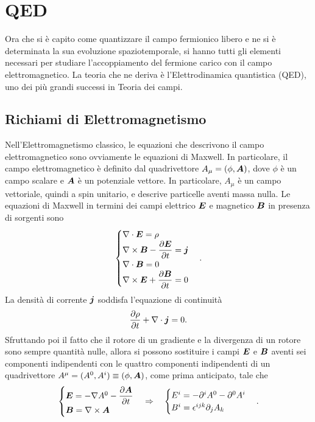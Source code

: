 \chapter{QED}
Ora che si è capito come quantizzare il campo fermionico libero e ne si è determinata la sua evoluzione spaziotemporale, si hanno tutti gli elementi necessari per studiare l'accoppiamento del fermione carico con il campo elettromagnetico. La teoria che ne deriva è l'Elettrodinamica quantistica (QED), uno dei più grandi successi in Teoria dei campi.

\section{Richiami di Elettromagnetismo}
Nell'Elettromagnetismo classico, le equazioni che descrivono il campo elettromagnetico sono ovviamente le equazioni di Maxwell. In particolare, il campo elettromagnetico è definito dal quadrivettore $A_\mu = (\phi,\bm{A})$, dove $\phi$ è un campo scalare e $\bm{A}$ è un potenziale vettore. In particolare, $A_\mu$ è un campo vettoriale, quindi a spin unitario, e descrive particelle aventi massa nulla. Le equazioni di Maxwell in termini dei campi elettrico $\bm{E}$ e magnetico $\bm{B}$ in presenza di sorgenti sono
\begin{equation}
\label{eq: equazioni Maxwell in E e B}
    \begin{cases}
        \nabla\cdot\bm{E} = \rho \\
        \nabla\times\bm{B} - \dfrac{\partial \bm{E}}{\partial t} = \bm{j} \\
        \nabla\cdot\bm{B} = 0 \\
        \nabla\times\bm{E} + \dfrac{\partial \bm{B}}{\partial t} = 0
    \end{cases}.
\end{equation}
La densità di corrente $\bm{j}$ soddisfa l'equazione di continuità
\begin{equation}
\label{eq: equazione di continuità Maxwell}
    \frac{\partial \rho}{\partial t} + \nabla\cdot\bm{j} = 0.
\end{equation}
Sfruttando poi il fatto che il rotore di un gradiente e la divergenza di un rotore sono sempre quantità nulle, allora si possono sostituire i campi $\bm{E}$ e $\bm{B}$ aventi sei componenti indipendenti con le quattro componenti indipendenti di un quadrivettore $A^\mu = (A^0,A^i) \equiv (\phi,\bm{A})$, come prima anticipato, tale che
\begin{equation}
\label{eq: definizione A_mu}
    \begin{cases}
        \bm{E} = -\nabla A^0 - \dfrac{\partial \bm{A}}{\partial t} \\
        \bm{B} = \nabla\times\bm{A}
    \end{cases}\Rightarrow\quad
    \begin{cases}
        E^i = -\partial^iA^0 - \partial^0A^i \\
        B^i = \epsilon^{ijk}\partial_jA_k
    \end{cases}.
\end{equation}
